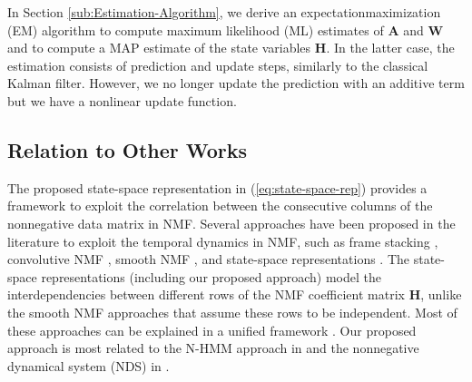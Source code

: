 \documentclass[10pt,twocolumn,twoside] {IEEEtran}
\begin{document}
In Section \ref{sub:Estimation-Algorithm}, we derive an expectation\textendash{}maximization
(EM) algorithm to compute maximum likelihood (ML) estimates of $\mathbf{A}$
and $\mathbf{W}$ and to compute a MAP estimate of the state variables
$\mathbf{H}$. In the latter case, the estimation consists of prediction
and update steps, similarly to the classical Kalman filter. However,
we no longer update the prediction with an additive term but we have
a nonlinear update function.

\subsection{Relation to Other Works \label{sub:Relation-to-Other}}

The proposed state-space representation in (\ref{eq:state-space-rep}) provides a framework to exploit the
correlation between the consecutive columns of the nonnegative data matrix
in NMF. Several approaches have been proposed in the literature
to exploit the temporal dynamics in NMF, such as frame stacking \cite{Gemmeke2011a},
convolutive NMF \cite{Smaragdis2007,Wang2009}, smooth NMF \cite{Fevotte2009,Mohammadiha2011a,Mohammadiha2012a,Mohammadiha2013d},
and state-space representations \cite{Mysore2010,Nakano2010,Mohammadiha2013c,Mohammadiha2013,Mohammadiha2013b,Fevotte2013}. The state-space representations (including our proposed approach) model the interdependencies between different rows of the NMF coefficient matrix $\mathbf{H}$, unlike the smooth NMF approaches that assume these rows to be independent. Most of these approaches can be explained in a unified framework \cite{Smaragdis2014}. Our proposed approach is most related to the N-HMM approach in \cite{Mysore2010} and the nonnegative dynamical system (NDS) in \cite{Fevotte2013}.
\end{document}
